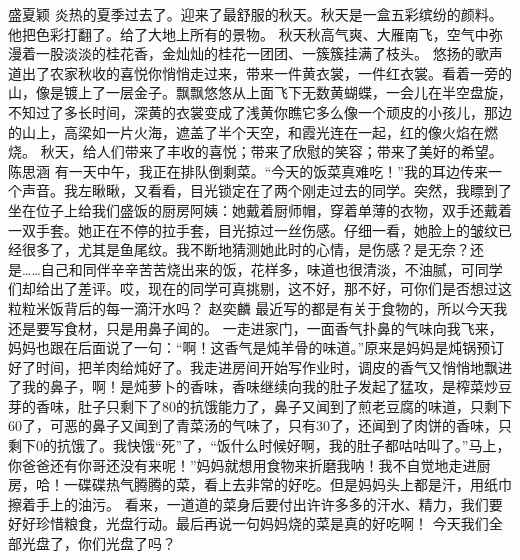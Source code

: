 {}\markdownRendererInterblockSeparator
{}盛夏颖\markdownRendererInterblockSeparator
{}炎热的夏季过去了。迎来了最舒服的秋天。秋天是一盒五彩缤纷的颜料。他把色彩打翻了。给了大地上所有的景物。\markdownRendererInterblockSeparator
{}秋天秋高气爽、大雁南飞，空气中弥漫着一股淡淡的桂花香，金灿灿的桂花一团团、一簇簇挂满了枝头。\markdownRendererInterblockSeparator
{}悠扬的歌声道出了农家秋收的喜悦你悄悄走过来，带来一件黄衣裳，一件红衣裳。看着一旁的山，像是镀上了一层金子。飘飘悠悠从上面飞下无数黄蝴蝶，一会儿在半空盘旋，不知过了多长时间，深黄的衣裳变成了浅黄你瞧它多么像一个顽皮的小孩儿，那边的山上，高梁如一片火海，遮盖了半个天空，和霞光连在一起，红的像火焰在燃烧。\markdownRendererInterblockSeparator
{}秋天，给人们带来了丰收的喜悦；带来了欣慰的笑容；带来了美好的希望。\markdownRendererInterblockSeparator
{}\markdownRendererInterblockSeparator
{}陈思涵\markdownRendererInterblockSeparator
{}有一天中午，我正在排队倒剩菜。“今天的饭菜真难吃！”我的耳边传来一个声音。我左瞅瞅，又看看，目光锁定在了两个刚走过去的同学。突然，我瞟到了坐在位子上给我们盛饭的厨房阿姨：她戴着厨师帽，穿着单薄的衣物，双手还戴着一双手套。她正在不停的拉手套，目光掠过一丝伤感。仔细一看，她脸上的皱纹已经很多了，尤其是鱼尾纹。我不断地猜测她此时的心情，是伤感？是无奈？还是……自己和同伴辛辛苦苦烧出来的饭，花样多，味道也很清淡，不油腻，可同学们却给出了差评。哎，现在的同学可真挑剔，这不好，那不好，可你们是否想过这粒粒米饭背后的每一滴汗水吗？\markdownRendererInterblockSeparator
{}\markdownRendererInterblockSeparator
{}赵奕麟\markdownRendererInterblockSeparator
{}最近写的都是有关于食物的，所以今天我还是要写食材，只是用鼻子闻的。 一走进家门，一面香气扑鼻的气味向我飞来，妈妈也跟在后面说了一句：“啊！这香气是炖羊骨的味道。”原来是妈妈是炖锅预订好了时间，把羊肉给炖好了。我走进房间开始写作业时，调皮的香气又悄悄地飘进了我的鼻子，啊！是炖萝卜的香味，香味继续向我的肚子发起了猛攻，是榨菜炒豆芽的香味，肚子只剩下了80\markdownRendererPercentSign{}的抗饿能力了，鼻子又闻到了煎老豆腐的味道，只剩下60\markdownRendererPercentSign{}了，可恶的鼻子又闻到了青菜汤的气味了，只有30\markdownRendererPercentSign{}了，还闻到了肉饼的香味，只剩下0\markdownRendererPercentSign{}的抗饿了。我快饿“死”了，“饭什么时候好啊，我的肚子都咕咕叫了。”马上，你爸爸还有你哥还没有来呢！”妈妈就想用食物来折磨我呐！我不自觉地走进厨房，哈！一碟碟热气腾腾的菜，看上去非常的好吃。但是妈妈头上都是汗，用纸巾擦着手上的油污。 看来，一道道的菜身后要付出许许多多的汗水、精力，我们要好好珍惜粮食，光盘行动。最后再说一句妈妈烧的菜是真的好吃啊！ 今天我们全部光盘了，你们光盘了吗？\markdownRendererInterblockSeparator
